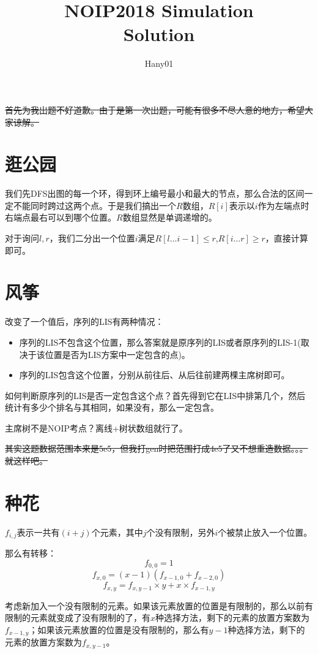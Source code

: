 \documentclass{article}
\begin{document}
    \title{NOIP2018 Simulation \\ Solution}
    \author{Hany01}
	\newpage
	\maketitle
	\sout{首先为我出题不好道歉。由于是第一次出题，可能有很多不尽人意的地方，希望大家谅解。}

		\section*{逛公园}
		我们先DFS出图的每一个环，得到环上编号最小和最大的节点，那么合法的区间一定不能同时跨过这两个点。于是我们搞出一个$R$数组，$R[i]$表示以$i$作为左端点时右端点最右可以到哪个位置。$R$数组显然是单调递增的。

		对于询问$l,r$，我们二分出一个位置$i$满足$R[l\dots i-1]\le r$,$R[i\dots r]\ge r$，直接计算即可。


		\section*{风筝}
		改变了一个值后，序列的LIS有两种情况：
		\begin{itemize}
			\item 序列的LIS不包含这个位置，那么答案就是原序列的LIS或者原序列的LIS-1(取决于该位置是否为LIS方案中一定包含的点)。
			\item 序列的LIS包含这个位置，分别从前往后、从后往前建两棵主席树即可。
		\end{itemize}

		如何判断原序列的LIS是否一定包含这个点？首先得到它在LIS中排第几个，然后统计有多少个排名与其相同，如果没有，那么一定包含。

		主席树不是NOIP考点？离线+树状数组就行了。

		\sout{其实这题数据范围本来是5e5，但我打gen时把范围打成4e5了又不想重造数据。。。就这样吧。}


		\section*{种花}
		$f_{i,j}$表示一共有$(i+j)$个元素，其中$j$个没有限制，另外$i$个被禁止放入一个位置。

那么有转移：
$$f_{0,0}=1$$
$$f_{x,0}=(x-1)(f_{x-1,0} + f_{x-2,0})$$
$$f_{x,y}=f_{x,y - 1} \times y + x \times f_{x - 1, y}$$

考虑新加入一个没有限制的元素。如果该元素放置的位置是有限制的，那么以前有限制的元素就变成了没有限制的了，有$x$种选择方法，剩下的元素的放置方案数为$f_{x-1,y}$；如果该元素放置的位置是没有限制的，那么有$y-1$种选择方法，剩下的元素的放置方案数为$f_{x,y-1}$。
\end{document}
